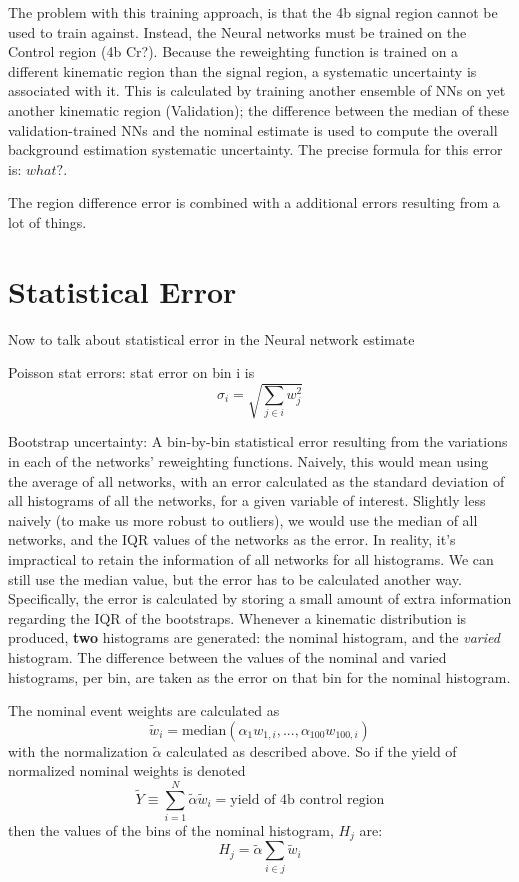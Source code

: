 The problem with this training approach, is that the 4b signal region cannot be used to train against.
Instead, the Neural networks must be trained on the Control region (4b Cr?).
Because the reweighting function is trained on a different kinematic region than the signal region,
    a systematic uncertainty is associated with it.
This is calculated by training another ensemble of NNs on yet another kinematic region (Validation);
    the difference between the median of these validation-trained NNs and the nominal estimate
    is used to compute the overall background estimation systematic uncertainty.
The precise formula for this error is:
    $what?$.


The region difference error is combined with a additional errors resulting from a lot of things.

\section{Statistical Error}

Now to talk about statistical error in the Neural network estimate

Poisson stat errors: stat error on bin i is 
    \begin{equation}
    \sigma_i = \sqrt{\sum_{j \in i} w_j^2}
    \end{equation}

Bootstrap uncertainty: A bin-by-bin statistical error resulting from the variations in each of the networks' reweighting functions.
Naively, this would mean using the average of all networks, with an error calculated as the standard deviation of all histograms of all the networks, for a given variable of interest.
Slightly less naively (to make us more robust to outliers),
    we would use the median of all networks, and the IQR values of the networks as the error.
In reality, it's impractical to retain the information of all networks for all histograms.
We can still use the median value, but the error has to be calculated another way.
Specifically, the error is calculated by storing a small amount of extra information regarding the IQR of the bootstraps.
Whenever a kinematic distribution is produced, \textbf{two} histograms are generated:
    the nominal histogram, and the \textit{varied} histogram.
The difference between the values of the nominal and varied histograms, per bin,
    are taken as the error on that bin for the nominal histogram.

The nominal event weights are calculated as
    \begin{equation}
    \tilde w_i = \textrm{median}(\alpha_1 w_{1,i}, ..., \alpha_{100} w_{100,i})
    \end{equation}
    with the normalization $\tilde \alpha$ calculated as described above.
So if the yield of normalized nominal weights is denoted
    \begin{equation}
    \tilde Y \equiv \sum_{i=1}^{N} \tilde \alpha \tilde w_i = \textrm{yield of 4b control region}
    \end{equation}
then the values of the bins of the nominal histogram, $H_j$ are:
    \begin{equation}
    H_j = \tilde \alpha \sum_{i \in j} \tilde w_i
    \end{equation}

